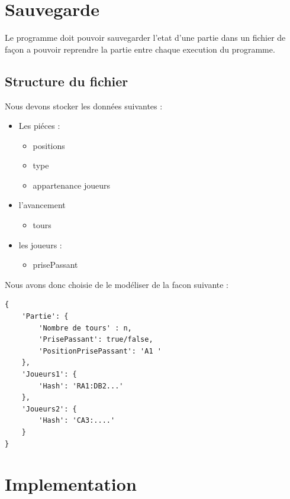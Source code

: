 \documentclass[12pt]{article}
\begin{document}
\section{Sauvegarde}\label{sauvegarde}

Le programme doit pouvoir sauvegarder l'etat d'une partie dans un
fichier de façon a pouvoir reprendre la partie entre chaque execution du
programme.

\subsection{Structure du fichier}\label{structure-du-fichier}

Nous devons stocker les données suivantes :

\begin{itemize}
\itemsep1pt\parskip0pt
\item
  Les piéces :

  \begin{itemize}
  \itemsep1pt\parskip0pt
  \item
    positions
  \item
    type
  \item
    appartenance joueurs
  \end{itemize}
\item
  l'avancement

  \begin{itemize}
  \itemsep1pt\parskip0pt
  \item
    tours
  \end{itemize}
\item
  les joueurs :

  \begin{itemize}
  \itemsep1pt\parskip0pt
  \item
    prisePassant
  \end{itemize}
\end{itemize}

Nous avons donc choisie de le modéliser de la facon suivante :

\begin{lstlisting}
{
    'Partie': {
        'Nombre de tours' : n,
        'PrisePassant': true/false,
        'PositionPrisePassant': 'A1 '
    },
    'Joueurs1': {
        'Hash': 'RA1:DB2...'
    },
    'Joueurs2': {
        'Hash': 'CA3:....'
    }
}
\end{lstlisting}

\section{Implementation}\label{implementation-1}
\end{document}
